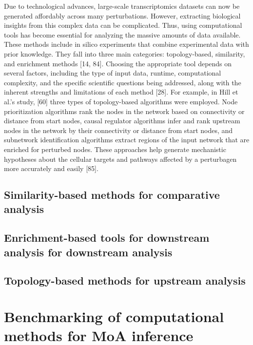 Due to technological advances, large-scale transcriptomics datasets can now be generated affordably across many perturbations. However, extracting biological insights from this complex data can be complicated. Thus, using computational tools has become essential for analyzing the massive amounts of data available. These methods include in silico experiments that combine experimental data with prior knowledge. They fall into three main categories: topology-based, similarity, and enrichment methods [14, 84]. Choosing the appropriate tool depends on several factors, including the type of input data, runtime, computational complexity, and the specific scientific questions being addressed, along with the inherent strengths and limitations of each method [28]. For example, in Hill et al.'s study, [60] three types of topology-based algorithms were employed. Node prioritization algorithms rank the nodes in the network based on connectivity or distance from start nodes, causal regulator algorithms infer and rank upstream nodes in the network by their connectivity or distance from start nodes, and subnetwork identification algorithms extract regions of the input network that are enriched for perturbed nodes. These approaches help generate mechanistic hypotheses about the cellular targets and pathways affected by a perturbagen more accurately and easily [85]. 

\subsection{Similarity-based methods for comparative analysis} %
\label{sub:Similarity-based_methods}

\subsection{Enrichment-based tools for downstream analysis for downstream analysis} %
\label{sub:Enrichment-based_tools}

\subsection{Topology-based methods for upstream analysis} %
\label{sub:Topology-based_methods}



\section{Benchmarking of computational methods for MoA inference} %
\label{sec:benchmarking_of_computational_methods_for_MoA_inference}

